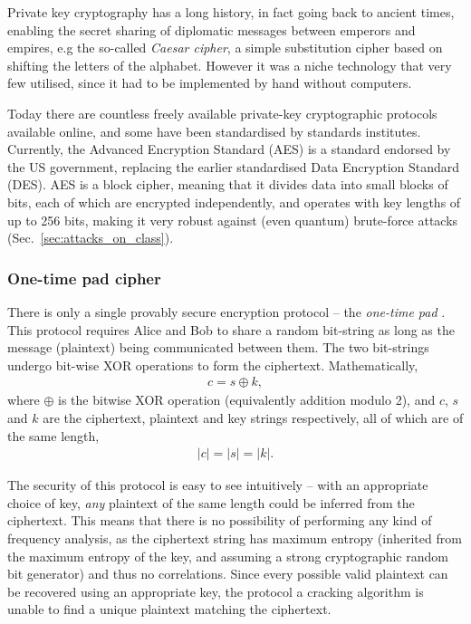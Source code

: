 Private key cryptography has a long history, in fact going back to ancient times, enabling the secret sharing of diplomatic messages between emperors and empires, e.g the so-called \textit{Caesar cipher}, a simple substitution cipher based on shifting the letters of the alphabet. However it was a niche technology that very few utilised, since it had to be implemented by hand without computers.

Today there are countless freely available private-key cryptographic protocols available online, and some have been standardised by standards institutes. Currently, the Advanced Encryption Standard (AES) is a standard endorsed by the US government, replacing the earlier standardised Data Encryption Standard (DES). AES is a block cipher, meaning that it divides data into small blocks of bits, each of which are encrypted independently, and operates with key lengths of up to 256 bits, making it very robust against (even quantum) brute-force attacks (Sec.~\ref{sec:attacks_on_class}).

%
%

\subsubsection{One-time pad cipher}

There is only a single provably secure encryption protocol -- the \textit{one-time pad} \cite{bib:Schneier96}. This protocol requires Alice and Bob to share a random bit-string as long as the message (plaintext) being communicated between them. The two bit-strings undergo bit-wise XOR operations to form the ciphertext. Mathematically,
\begin{align}
c = s \oplus k,
\end{align}
where $\oplus$ is the bitwise XOR operation (equivalently addition modulo 2), and $c$, $s$ and $k$ are the ciphertext, plaintext and key strings respectively, all of which are of the same length,
\begin{align}
	|c|=|s|=|k|.
\end{align}

The security of this protocol is easy to see intuitively -- with an appropriate choice of key, \textit{any} plaintext of the same length could be inferred from the ciphertext. This means that there is no possibility of performing any kind of frequency analysis, as the ciphertext string has maximum entropy (inherited from the maximum entropy of the key, and assuming a strong cryptographic random bit generator) and thus no correlations. Since every possible valid plaintext can be recovered using an appropriate key, the protocol a cracking algorithm is unable to find a unique plaintext matching the ciphertext.

